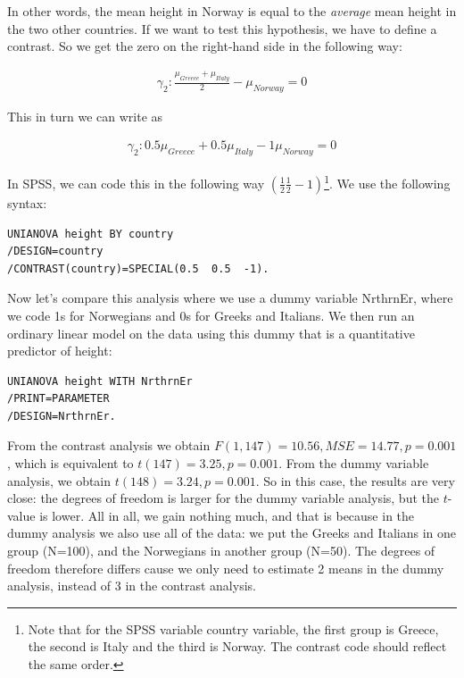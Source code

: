 \documentclass[]{book}\usepackage[]{graphicx}\usepackage[]{color}
\begin{document}
In other words, the mean height in Norway is equal to the \textit{average} mean height in the two other countries. If we want to test this hypothesis, we have to define a contrast. So we get the zero on the right-hand side in the following way:

\begin{eqnarray}
\gamma_2 : \frac{\mu_{Greece} + \mu_{Italy}} {2} - \mu_{Norway}  = 0 
\end{eqnarray}


This in turn we can write as 

\begin{eqnarray}
\gamma_2 : 0.5 \mu_{Greece} + 0.5 \mu_{Italy} - 1 \mu_{Norway}  = 0 
\end{eqnarray}


In SPSS, we can code this in the following way $(\frac{1}{2} \frac{1}{2} -1)$\footnote{Note that for the SPSS variable country variable, the first group is Greece, the second is Italy and the third is Norway. The contrast code should reflect the same order.}. We use the following syntax:

\begin{verbatim}
UNIANOVA height BY country
/DESIGN=country
/CONTRAST(country)=SPECIAL(0.5  0.5  -1).
\end{verbatim}


Now let's compare this analysis where we use a dummy variable NrthrnEr, where we code 1s for Norwegians and 0s for Greeks and Italians. We then run an ordinary linear model on the data using this dummy that is a quantitative predictor of height:


\begin{verbatim}
UNIANOVA height WITH NrthrnEr
/PRINT=PARAMETER
/DESIGN=NrthrnEr.
\end{verbatim}

From the contrast analysis we obtain $F(1,147)=10.56, MSE=14.77, p=0.001$, which is equivalent to $t(147)=3.25, p=0.001$. From the dummy variable analysis, we obtain $t(148)= 3.24, p=0.001$. So in this case, the results are very close: the degrees of freedom is larger for the dummy variable analysis, but the $t$-value is lower. All in all, we gain nothing much, and that is because in the dummy analysis we also use all of the data: we put the Greeks and Italians in one group (N=100), and the Norwegians in another group (N=50). The degrees of freedom therefore differs cause we only need to estimate 2 means in the dummy analysis, instead of 3 in the contrast analysis.
\end{document}
